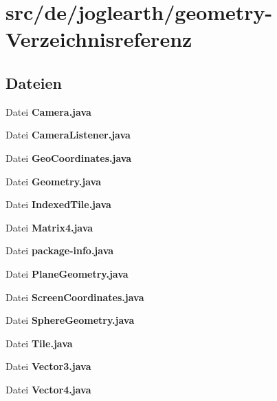 \section{src/de/joglearth/geometry-\/\-Verzeichnisreferenz}
\label{dir_c0ff63119d263ea4d1c46a9b982d5c97}
\subsection*{Dateien}
\begin{DoxyCompactItemize}
\item 
Datei {\bfseries Camera.\-java}
\item 
Datei {\bfseries Camera\-Listener.\-java}
\item 
Datei {\bfseries Geo\-Coordinates.\-java}
\item 
Datei {\bfseries Geometry.\-java}
\item 
Datei {\bfseries Indexed\-Tile.\-java}
\item 
Datei {\bfseries Matrix4.\-java}
\item 
Datei {\bfseries package-\/info.\-java}
\item 
Datei {\bfseries Plane\-Geometry.\-java}
\item 
Datei {\bfseries Screen\-Coordinates.\-java}
\item 
Datei {\bfseries Sphere\-Geometry.\-java}
\item 
Datei {\bfseries Tile.\-java}
\item 
Datei {\bfseries Vector3.\-java}
\item 
Datei {\bfseries Vector4.\-java}
\end{DoxyCompactItemize}
